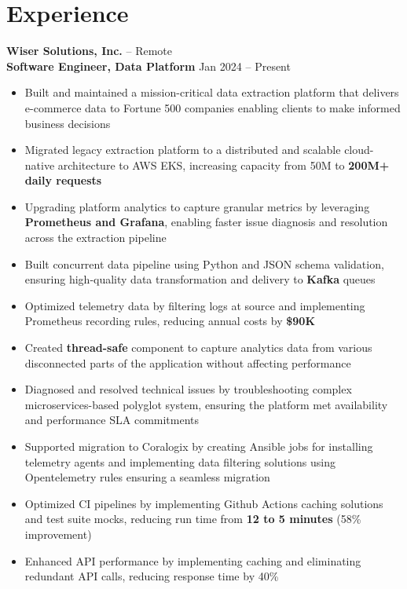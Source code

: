 \documentclass[11pt]{article}       %
\begin{document}
\section*{Experience}
\textbf{Wiser Solutions, Inc.} -- Remote \\
\textbf{Software Engineer, Data Platform} \hfill Jan 2024 -- Present \\
\vspace{-9pt}
\begin{itemize}
  \item Built and maintained a mission-critical data extraction platform that delivers e-commerce data to Fortune 500 companies enabling clients to make informed business decisions \\
  \item Migrated legacy extraction platform to a distributed and scalable cloud-native architecture to AWS EKS, increasing capacity from 50M to \textbf{200M+ daily requests} \\
  \item Upgrading platform analytics to capture granular metrics by leveraging \textbf{Prometheus and Grafana}, enabling faster issue diagnosis and resolution across the extraction pipeline \\
  \item Built concurrent data pipeline using Python and JSON schema validation, ensuring high-quality data transformation and delivery to \textbf{Kafka} queues \\
  \item Optimized telemetry data by filtering logs at source and implementing Prometheus recording rules, reducing annual costs by \textbf{\$90K} \\
  \item Created \textbf{thread-safe} component to capture analytics data from various disconnected parts of the application without affecting performance \\
  \item Diagnosed and resolved technical issues by troubleshooting complex microservices-based polyglot system, ensuring the platform met availability and performance SLA commitments \\
  \item Supported migration to Coralogix by creating Ansible jobs for installing telemetry agents and implementing data filtering solutions using Opentelemetry rules ensuring a seamless migration \\
  \item Optimized CI pipelines by implementing Github Actions caching solutions and test suite mocks, reducing run time from \textbf{12 to 5 minutes} (58\% improvement) \\
  \item Enhanced API performance by implementing caching and eliminating redundant API calls, reducing response time by 40\% \\
\end{itemize}
\end{document}
